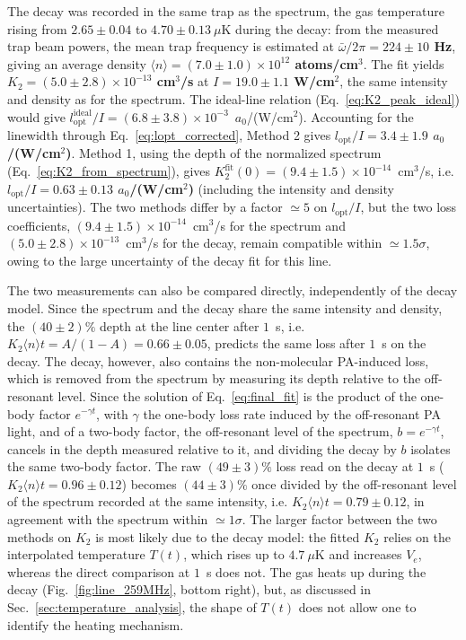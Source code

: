 The decay was recorded in the same
trap as the spectrum, the gas temperature rising from $2.65\pm0.04$ to $4.70\pm0.13~\mu$K during the decay:
from the measured trap beam powers, the mean trap frequency is
estimated at \textbf{$\bar\omega/2\pi = 224\pm10$ Hz}, giving an average density
\textbf{$\langle n\rangle = (7.0\pm1.0)\times10^{12}$ atoms/cm$^3$}.
The fit yields \textbf{$K_2 = (5.0\pm2.8)\times10^{-13}$ cm$^3$/s} at
\textbf{$I=19.0\pm1.1$ W/cm$^2$}, the same intensity and density as for the spectrum. The
ideal-line relation (Eq.~\ref{eq:K2_peak_ideal}) would give
$l_{\text{opt}}^{\text{ideal}}/I=(6.8\pm3.8)\times10^{-3}$~$a_0$/(W/cm$^2$).
Accounting for the linewidth through Eq.~\ref{eq:lopt_corrected}, Method 2 gives
\textbf{$l_{\text{opt}}/I=3.4\pm1.9$ $a_0$/(W/cm$^2$)}. Method 1, using the depth
of the normalized spectrum (Eq.~\ref{eq:K2_from_spectrum}), gives
$K_2^{\text{fit}}(0) = (9.4\pm1.5)\times10^{-14}$~cm$^3$/s, i.e.
\textbf{$l_{\text{opt}}/I=0.63\pm0.13$ $a_0$/(W/cm$^2$)} (including the intensity and
density uncertainties). The two methods differ by a factor $\simeq5$ on $l_{\text{opt}}/I$, but the two loss
coefficients, $(9.4\pm1.5)\times10^{-14}$~cm$^3$/s for the spectrum and
$(5.0\pm2.8)\times10^{-13}$~cm$^3$/s for the decay, remain compatible within $\simeq1.5\sigma$,
owing to the large uncertainty of the decay fit for this line.

The two measurements can also be compared directly, independently of the decay model.
Since the spectrum and the decay share the same intensity and density, the
$(40\pm2)\%$ depth at the line center after $1$~s, i.e.
$K_2\langle n\rangle t=A/(1-A)=0.66\pm0.05$, predicts the same loss after $1$~s on the
decay. The decay, however, also contains the non-molecular PA-induced loss, which is
removed from the spectrum by measuring its depth relative to the off-resonant level. Since the
solution of Eq.~\ref{eq:final_fit} is the product of the one-body factor $e^{-\gamma t}$,
with $\gamma$ the one-body loss rate induced by the off-resonant PA light, and of a
two-body factor, the off-resonant level of the spectrum, $b=e^{-\gamma t}$, cancels in
the depth measured relative to it, and dividing the decay by $b$ isolates the same
two-body factor. The raw
$(49\pm3)\%$ loss read on the decay at $1$~s ($K_2\langle n\rangle t=0.96\pm0.12$) becomes
$(44\pm3)\%$ once divided by the off-resonant level of the spectrum recorded at the same
intensity, i.e. $K_2\langle n\rangle t=0.79\pm0.12$, in agreement with the spectrum within
$\simeq1\sigma$. The larger factor between the two methods on $K_2$ is most likely due to
the decay model: the fitted $K_2$ relies on the interpolated temperature $T(t)$, which rises up to
$4.7~\mu$K and increases $V_e$, whereas the direct comparison at $1$~s does not. 
The gas heats up during the decay (Fig.~\ref{fig:line_259MHz}, bottom right), but, as
discussed in Sec.~\ref{sec:temperature_analysis}, the shape of $T(t)$ does not allow one to
identify the heating mechanism.

